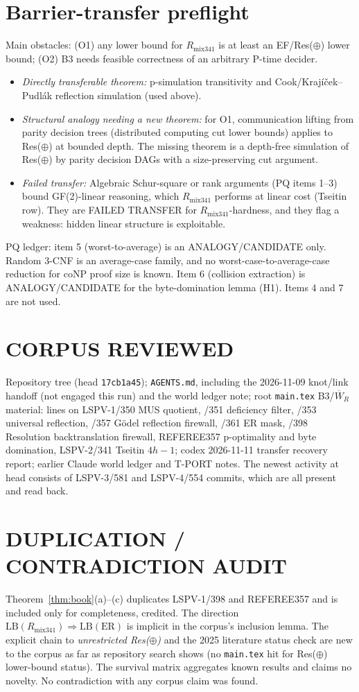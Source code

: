 \documentclass[11pt]{article}
\theoremstyle{definition}
\newcommand{\Wb}{\overline W}
\newcommand{\Rm}{R_{\mathrm{mix341}}}
\begin{document}
\section*{Barrier-transfer preflight}
Main obstacles: (O1) any lower bound for $\Rm$ is at least an EF/Res($\oplus$)
lower bound; (O2) B3 needs feasible correctness of an arbitrary P-time
decider.
\begin{itemize}
\item \emph{Directly transferable theorem:} p-simulation transitivity and
Cook/Krajíček--Pudlák reflection simulation (used above).
\item \emph{Structural analogy needing a new theorem:} for O1, communication
lifting from parity decision trees (distributed computing cut lower bounds)
applies to Res($\oplus$) at bounded depth. The missing theorem is a
depth-free simulation of Res($\oplus$) by parity decision DAGs with a
size-preserving cut argument.
\item \emph{Failed transfer:} Algebraic Schur-square or rank arguments (PQ
items 1--3) bound GF(2)-linear reasoning, which $\Rm$ performs at linear cost
(Tseitin row). They are FAILED TRANSFER for $\Rm$-hardness, and they flag a
weakness: hidden linear structure is exploitable.
\end{itemize}
PQ ledger: item 5 (worst-to-average) is an ANALOGY/CANDIDATE only. Random
3-CNF is an average-case family, and no worst-case-to-average-case reduction
for coNP proof size is known. Item 6 (collision extraction) is
ANALOGY/CANDIDATE for the byte-domination lemma (H1). Items 4 and 7 are not
used.

\section*{CORPUS REVIEWED}
Repository tree (head \texttt{17cb1a45}); \texttt{AGENTS.md}, including the
2026-11-09 knot/link handoff (not engaged this run) and the world ledger
note; root \texttt{main.tex} B3/$\Wb_R$ material: lines on LSPV-1/350 MUS
quotient, /351 deficiency filter, /353 universal reflection, /357 Gödel
reflection firewall, /361 ER mask, /398 Resolution backtranslation firewall,
REFEREE357 p-optimality and byte domination, LSPV-2/341 Tseitin $4h{-}1$;
codex 2026-11-11 transfer recovery report; earlier Claude world ledger and
T-PORT notes. The newest activity at head consists of LSPV-3/581 and
LSPV-4/554 commits, which are all present and read back.

\section*{DUPLICATION / CONTRADICTION AUDIT}
Theorem~\ref{thm:book}(a)--(c) duplicates LSPV-1/398 and REFEREE357 and is
included only for completeness, credited. The direction
$\mathrm{LB}(\Rm)\Rightarrow\mathrm{LB}(\mathrm{ER})$ is implicit in the
corpus's inclusion lemma. The explicit chain to \emph{unrestricted
Res($\oplus$)} and the 2025 literature status check are new to the corpus as
far as repository search shows (no \texttt{main.tex} hit for Res($\oplus$)
lower-bound status). The survival matrix aggregates known results and claims
no novelty. No contradiction with any corpus claim was found.
\end{document}
